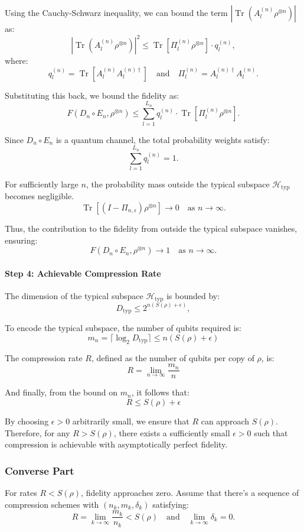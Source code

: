 Using the Cauchy-Schwarz inequality, we can bound the term \(\left| \operatorname{Tr}(A_l^{(n)} \rho^{\otimes n}) \right|\) as:
\[
\left| \operatorname{Tr}(A_l^{(n)} \rho^{\otimes n}) \right|^2 \leq \operatorname{Tr}[\Pi_l^{(n)} \rho^{\otimes n}] \cdot q_l^{(n)},
\]
where:
\[
q_l^{(n)} = \operatorname{Tr}[A_l^{(n)} A_l^{(n)\dagger}] \quad \text{and} \quad \Pi_l^{(n)} = A_l^{(n)\dagger} A_l^{(n)}.
\]

Substituting this back, we bound the fidelity as:
\[
F(D_n \circ E_n, \rho^{\otimes n}) \leq \sum_{l=1}^{L_n} q_l^{(n)} \cdot \operatorname{Tr}[\Pi_l^{(n)} \rho^{\otimes n}].
\]

Since \(D_n \circ E_n\) is a quantum channel, the total probability weights satisfy:
\[
\sum_{l=1}^{L_n} q_l^{(n)} = 1.
\]

For sufficiently large \(n\), the probability mass outside the typical subspace \(\mathcal{H}_{\text{typ}}\) becomes negligible.
\[
\operatorname{Tr}[(I - \Pi_{n, \epsilon}) \rho^{\otimes n}] \to 0 \quad \text{as } n \to \infty.
\]

Thus, the contribution to the fidelity from outside the typical subspace vanishes, ensuring:
\[
F(D_n \circ E_n, \rho^{\otimes n}) \to 1 \quad \text{as } n \to \infty.
\]

\paragraph{Step 4: Achievable Compression Rate}

The dimension of the typical subspace \(\mathcal{H}_{\text{typ}}\) is bounded by:
\[
D_{\text{typ}} \leq 2^{n(S(\rho) + \epsilon)},
\]

To encode the typical subspace, the number of qubits required is:
\[
m_n = \lceil \log_2 D_{\text{typ}} \rceil \leq n(S(\rho) + \epsilon)
\]

The compression rate \(R\), defined as the number of qubits per copy of \(\rho\), is:
\[
R = \lim_{n \to \infty} \frac{m_n}{n}
\]

And finally, from the bound on \(m_n\), it follows that:
\[
R \leq S(\rho) + \epsilon
\]

By choosing \(\epsilon > 0\) arbitrarily small, we ensure that \(R\) can approach \(S(\rho)\). Therefore, for any \(R > S(\rho)\), there exists a sufficiently small \(\epsilon > 0\) such that compression is achievable with asymptotically perfect fidelity.

\subsubsection{Converse Part}
For rates \(R < S(\rho)\), fidelity approaches zero. Assume that there's a sequence of compression schemes with \((n_k, m_k, \delta_k)\) satisfying:
\[
R = \lim_{k \to \infty} \frac{m_k}{n_k} < S(\rho) \quad \text{and} \quad \lim_{k \to \infty} \delta_k = 0.
\]

